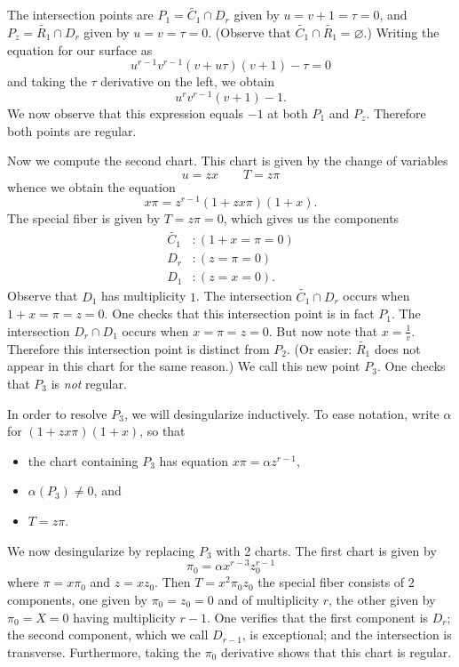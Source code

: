 \documentclass{article}
\theoremstyle{plain}
\theoremstyle{definition}
\theoremstyle{remark}
\renewcommand{\emptyset}{\varnothing}
\renewcommand{\tilde}[1]{\widetilde{#1}}
\begin{document}
The intersection points are $P_1 = \tilde{C_1} \cap D_r$ given by $u=v+1=\tau=0$, and $P_z = \tilde{R_1} \cap D_r$ given by $u=v=\tau=0$. (Observe that $\tilde{C_1} \cap \tilde{R_1} = \emptyset$.) Writing the equation for our surface as
\[
u^{r-1}v^{r-1}(v + u\tau)(v + 1) - \tau = 0
\]
and taking the $\tau$ derivative on the left, we obtain
\[
u^rv^{r-1}(v + 1) - 1.
\]
We now observe that this expression equals $-1$ at both $P_1$ and $P_z$. Therefore both points are regular.

Now we compute the second chart. This chart is given by the change of variables
\[
u=zx \qquad T=z\pi
\]
whence we obtain the equation
\[
x\pi = z^{r-1}(1 + zx\pi)(1 + x).
\]
The special fiber is given by $T = z\pi = 0$, which gives us the components
\begin{align*}
  \tilde{C_1}&: (1 + x = \pi = 0) \\
  D_r&: (z = \pi = 0) \\
  D_1&: (z = x = 0).
\end{align*}
Observe that $D_1$ has multiplicity $1$. The intersection $\tilde{C_1} \cap D_r$ occurs when $1 + x = \pi = z = 0$. One checks that this intersection point is in fact $P_1$. The intersection $D_r \cap D_1$ occurs when $x = \pi = z = 0$. But now note that $x = \frac{1}{v}$. Therefore this intersection point is distinct from $P_2$. (Or easier: $\tilde{R_1}$ does not appear in this chart for the same reason.) We call this new point $P_3$. One checks that $P_3$ is \emph{not} regular.

In order to resolve $P_3$, we will desingularize inductively. To ease notation, write $\alpha$ for $(1 + zx\pi)(1 + x)$, so that
\begin{itemize}
    \item the chart containing $P_3$ has equation $x\pi = \alpha z^{r-1}$,
    \item $\alpha(P_3) \neq 0$, and
    \item $T = z\pi$.
\end{itemize}

We now desingularize by replacing $P_3$ with 2 charts. The first chart is given by
\[
\pi_0 = \alpha x^{r-3} z_0^{r-1}
\]
where $\pi = x \pi_0$ and $z = x z_0$. Then $T = x^2 \pi_0 z_0$ the special fiber consists of 2 components, one given by $\pi_0 = z_0 = 0$ and of multiplicity $r$, the other given by $\pi_0 = X = 0$ having multiplicity $r-1$. One verifies that the first component is $D_r$; the second component, which we call $D_{r-1}$, is exceptional; and the intersection is transverse. Furthermore, taking the $\pi_0$ derivative shows that this chart is regular.
\end{document}
